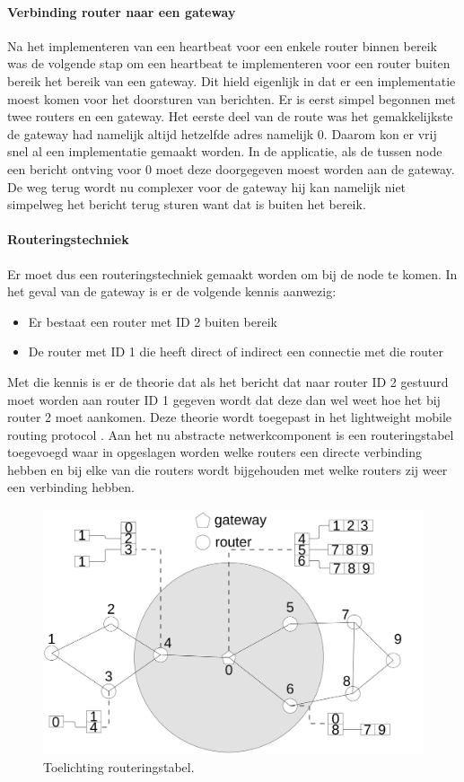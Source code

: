 \documentclass[a4paper, 11pt, oneside]{report}
\begin{document}
\paragraph{Verbinding router naar een gateway}
Na het implementeren van een heartbeat voor een enkele router binnen bereik was de volgende stap om een heartbeat te implementeren voor een router buiten bereik het bereik van een gateway. Dit hield eigenlijk in dat er een implementatie moest komen voor het doorsturen van berichten. Er is eerst simpel begonnen met twee routers en een gateway. Het eerste deel van de route was het gemakkelijkste de gateway had namelijk altijd hetzelfde adres namelijk 0. Daarom kon er vrij snel al een implementatie gemaakt worden. In de applicatie, als de tussen node een bericht ontving voor 0 moet deze doorgegeven moest worden aan de gateway. De weg terug wordt nu complexer voor de gateway hij kan namelijk niet simpelweg het bericht terug sturen want dat is buiten het bereik.
\paragraph{Routeringstechniek}
Er moet dus een routeringstechniek gemaakt worden om bij de node te komen.
In het geval van de gateway is er de volgende kennis aanwezig:
\begin{itemize}
	\item Er bestaat een router met ID 2 buiten bereik
	\item De router met ID 1 die heeft direct of indirect een connectie met die router
\end{itemize}

Met die kennis is er de theorie dat als het bericht dat naar router ID 2 gestuurd moet worden aan router ID 1 gegeven wordt dat deze dan wel weet hoe het bij router 2 moet aankomen.
Deze theorie wordt toegepast in het lightweight mobile routing protocol \cite{LMR}.
Aan het nu abstracte netwerkcomponent is een routeringstabel toegevoegd waar in opgeslagen worden welke routers een directe verbinding hebben en bij elke van die routers wordt bijgehouden met welke routers zij weer een verbinding hebben.

\begin{figure}[H]
	\begin{center}\includegraphics[width=0.6\linewidth]{Afbeeldingen/uitlegtabel.png}\end{center}
	\caption{Toelichting routeringstabel.}
	\label{fig:routeringstabel}
\end{figure}
\end{document}
